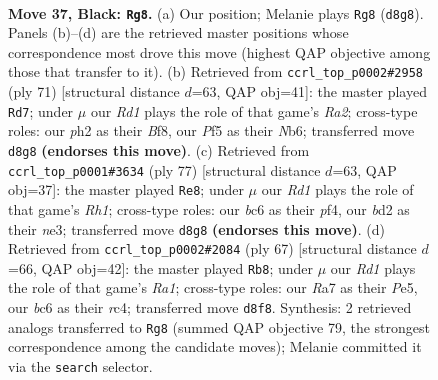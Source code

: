 \documentclass[11pt]{article}
\begin{document}
\clearpage

\begin{figure}[p]\centering
\begin{subfigure}{0.46\textwidth}\centering
\resizebox{\linewidth}{!}{%
\newchessgame
\chessboard[
  setfen={3r4/r7/p1Bnbk2/p4ppp/8/PP3PP1/3B3P/RK3RN1 b - - 2 37},
  showmover=false,
  pgfstyle=straightmove, color=movearrow, markmove={d8-g8}
]}
\caption{}
\end{subfigure}\hfill
\begin{subfigure}{0.46\textwidth}\centering
\resizebox{\linewidth}{!}{%
\newchessgame
\chessboard[
  setfen={5b2/r7/1n2ppk1/1rp3p1/p3P2p/2B4P/PPRN1PP1/3R1K2 b - - 8 36},
  showmover=false,
  pgfstyle=straightmove, color=movearrow, markmove={a7-d7}
]}
\caption{}
\end{subfigure}
\\[4pt]
\begin{subfigure}{0.46\textwidth}\centering
\resizebox{\linewidth}{!}{%
\newchessgame
\chessboard[
  setfen={7r/1p2nk2/4bpp1/p2p4/3P1P1p/P1PBN2P/1P2R2K/8 b - - 5 39},
  showmover=false,
  pgfstyle=straightmove, color=movearrow, markmove={h8-e8}
]}
\caption{}
\end{subfigure}\hfill
\begin{subfigure}{0.46\textwidth}\centering
\resizebox{\linewidth}{!}{%
\newchessgame
\chessboard[
  setfen={r4b2/p2k1p2/1p2n3/4p1pp/PPR1P3/4BPP1/4K2P/2N5 b - - 0 34},
  showmover=false,
  pgfstyle=straightmove, color=movearrow, markmove={a8-b8}
]}
\caption{}
\end{subfigure}
\caption{\textbf{Move 37, Black: \texttt{Rg8}.} (a) Our position; Melanie plays \texttt{Rg8} (\texttt{d8g8}). Panels (b)--(d) are the retrieved master positions whose correspondence most drove this move (highest QAP objective among those that transfer to it). (b) Retrieved from \texttt{ccrl\_top\_p0002\#2958} (ply 71) [structural distance $d$=63, QAP obj=41]: the master played \texttt{Rd7}; under $\mu$ our \emph{Rd1} plays the role of that game's \emph{Ra2}; cross-type roles: our \emph{p}h2 as their \emph{B}f8, our \emph{P}f5 as their \emph{N}b6; transferred move \texttt{d8g8} \textbf{(endorses this move)}. (c) Retrieved from \texttt{ccrl\_top\_p0001\#3634} (ply 77) [structural distance $d$=63, QAP obj=37]: the master played \texttt{Re8}; under $\mu$ our \emph{Rd1} plays the role of that game's \emph{Rh1}; cross-type roles: our \emph{b}c6 as their \emph{p}f4, our \emph{b}d2 as their \emph{n}e3; transferred move \texttt{d8g8} \textbf{(endorses this move)}. (d) Retrieved from \texttt{ccrl\_top\_p0002\#2084} (ply 67) [structural distance $d$=66, QAP obj=42]: the master played \texttt{Rb8}; under $\mu$ our \emph{Rd1} plays the role of that game's \emph{Ra1}; cross-type roles: our \emph{R}a7 as their \emph{P}e5, our \emph{b}c6 as their \emph{r}c4; transferred move \texttt{d8f8}. Synthesis: 2 retrieved analogs transferred to \texttt{Rg8} (summed QAP objective 79, the strongest correspondence among the candidate moves); Melanie committed it via the \texttt{search} selector.}
\label{fig:thought-m73}
\end{figure}
\end{document}
